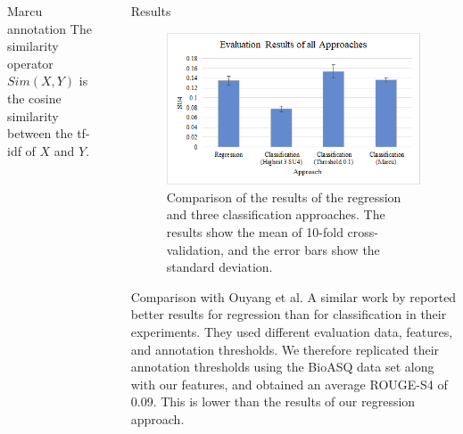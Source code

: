 \documentclass[final]{beamer}
\newlength{\sepwid}
\newlength{\onecolwid}
\begin{document}
\begin{frame}[t]
\begin{columns}[t]
\begin{column}{\onecolwid}
\begin{block}{Marcu annotation}
The similarity operator $Sim(X,Y)$ is the cosine similarity between the tf-idf of $X$ and $Y$.

\end{block}

\end{column} %

\begin{column}{\sepwid}\end{column} %

\begin{column}{\onecolwid} %

\begin{block}{Results}
\begin{figure}
\centering
\includegraphics[width=\linewidth]{resultfig_colored.png}
\caption{Comparison of the results of the regression and three classification approaches. The results show the mean of 10-fold cross-validation, and the error bars show the standard deviation.\label{fig:all_approaches}}
\end{figure}

\end{block}

{

\begin{alertblock}{Comparison with Ouyang et al.}
A similar work by \cite{Ouyang:2011} reported better results for regression than for classification in their experiments. They used different evaluation data, features, and annotation thresholds. We therefore replicated their annotation thresholds using the BioASQ data set along with our features, and obtained an average ROUGE-S4 of 0.09. This is lower than the results of our regression approach.


\end{alertblock}}
\end{column}
\end{columns}
\end{frame}
\end{document}
